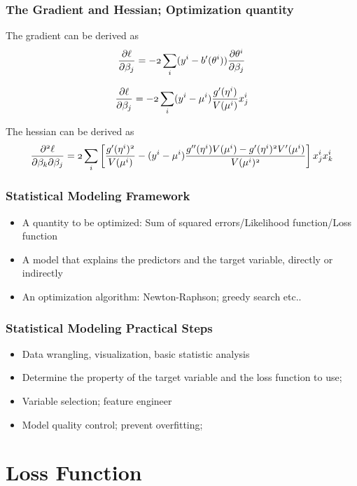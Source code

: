 \documentclass[notheorems, aspectratio=54, tikz,border=10pt,multi]{beamer}
\begin{document}
\begin{frame}
\frametitle{The Gradient and Hessian; Optimization quantity}
The gradient can be derived as
$$\mathnormal{\frac{\partial \ell}{\partial \beta_j}}=\mathnormal{-2\sum_i(y^i-b'(\theta^i))\frac{\partial\theta^i}{\partial\beta_j}}$$

$$\mathnormal{\frac{\partial \ell}{\partial \beta_j}}=\mathnormal{-2\sum_i(y^i-\mu^i)\frac{g'(\eta^i)}{V(\mu^i)}x_j^i}$$

The hessian can be derived as
$$\mathnormal{\frac{\partial^2 \ell}{\partial \beta_k\partial \beta_j}=2\sum_i\left[\frac{g'(\eta^i)^2}{V(\mu^i)}-(y^i-\mu^i)\frac{g''(\eta^i)V(\mu^i)-g'(\eta^i)^2V'(\mu^i)}{V(\mu^i)^2}\right]x_j^ix_k^i}$$
\end{frame}

\begin{frame}
\frametitle{Statistical Modeling Framework}
\begin{itemize}
\item A quantity to be optimized: Sum of squared errors/Likelihood function/Loss function
\item A model that explains the predictors and the target variable, directly or indirectly
\item An optimization algorithm: Newton-Raphson; greedy search etc..
\end{itemize}
\end{frame}

\begin{frame}
\frametitle{Statistical Modeling Practical Steps}
\begin{itemize}
\item Data wrangling, visualization, basic statistic analysis
\item Determine the property of the target variable and the loss function to use;
\item Variable selection; feature engineer
\item Model quality control; prevent overfitting; 
\end{itemize}
\end{frame}


\section{Loss Function}
\end{document}
